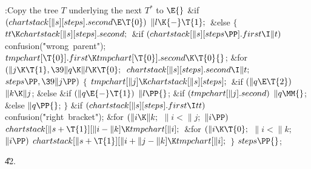 \Y\B\4:Copy the tree $T$ underlying the next $T^*$ to \X${}\E{}$\6
\&{if} ${}(\\{chartstack}[\|s][\\{steps}].\\{second}\E\T{0}){}$\1\5
${}\|l\K{-}\T{1};{}$\2\6
\&{else}\5
${}\{{}$\1\6
${}\\{tt}\K\\{chartstack}[\|s][\\{steps}].\\{second};{}$\6
\&{if} ${}(\\{chartstack}[\|s][\\{steps}\PP].\\{first}\I\|t){}$\1\5
\\{confusion}(\.{"wrong\ parent"});\2\6
${}\\{tmpchart}[\T{0}].\\{first}\K\\{tmpchart}[\T{0}].\\{second}\K\T{0}{}$;\6
\&{for} ${}(\|j\K\T{1},\39\|q\K\|l\K\T{0};{}$ ${}\\{chartstack}[\|s][%
\\{steps}].\\{second}\I\|t;{}$ ${}\\{steps}\PP,\39\|j\PP){}$\5
${}\{{}$\1\6
${}\\{tmpchart}[\|j]\K\\{chartstack}[\|s][\\{steps}];{}$\6
\&{if} ${}(\|q\E\T{2}){}$\1\5
${}\|k\K\|j{}$;\2\6
\&{else} \&{if} ${}(\|q\E{-}\T{1}){}$\1\5
${}\|l\PP{}$;\2\6
\&{if} ${}(\\{tmpchart}[\|j].\\{second}){}$\1\5
${}\|q\MM{}$;\5
\2\&{else}\1\5
${}\|q\PP{}$;\2\6
\4${}\}{}$\2\6
\&{if} ${}(\\{chartstack}[\|s][\\{steps}].\\{first}\I\\{tt}){}$\1\5
\\{confusion}(\.{"right\ bracket"});\2\6
\&{for} ${}(\|i\K\|k;{}$ ${}\|i<\|j;{}$ ${}\|i\PP){}$\1\5
${}\\{chartstack}[\|s+\T{1}][\|i-\|k]\K\\{tmpchart}[\|i];{}$\2\6
\&{for} ${}(\|i\K\T{0};{}$ ${}\|i<\|k;{}$ ${}\|i\PP){}$\1\5
${}\\{chartstack}[\|s+\T{1}][\|i+\|j-\|k]\K\\{tmpchart}[\|i];{}$\2\6
\4${}\}{}$\2\6
${}\\{steps}\PP{}$;\par
\U42.\fi

